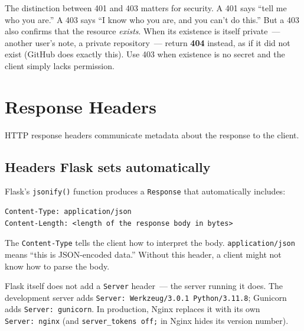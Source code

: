\noindent{}The distinction between 401 and 403 matters for security. A 401 says ``tell me who you are.'' A 403 says ``I know who you are, and you can't do this.'' But a 403 also confirms that the resource \emph{exists}. When its existence is itself private~--- another user's note, a private repository~--- return \textbf{404} instead, as if it did not exist (GitHub does exactly this). Use 403 when existence is no secret and the client simply lacks permission.

\setcounter{section}{2}
\section{Response Headers}\label{34-response-handling:343-response-headers}

HTTP response headers communicate metadata about the response to the client.

\subsection*{Headers Flask sets automatically}\label{34-response-handling:headers-flask-sets-automatically}

Flask's \texttt{jsonify()} function produces a \texttt{Response} that automatically includes:

\begin{outputbox}[short]
\begin{Verbatim}[fontsize=\codesize, breaklines, breakanywhere, breaksymbolleft={\tiny\textcolor{muted}{$\hookrightarrow$}}]
Content-Type: application/json
Content-Length: <length of the response body in bytes>
\end{Verbatim}
\end{outputbox}

\noindent{}The \texttt{Content-Type} tells the client how to interpret the body. \texttt{application/json} means ``this is JSON-encoded data.'' Without this header, a client might not know how to parse the body.

Flask itself does not add a \texttt{Server} header~--- the server running it does. The development server adds \texttt{Server:}\allowbreak{}\texttt{\ Werkzeug/}\allowbreak{}\texttt{3.}\allowbreak{}\texttt{0.}\allowbreak{}\texttt{1\ Python/}\allowbreak{}\texttt{3.}\allowbreak{}\texttt{11.}\allowbreak{}\texttt{8}; Gunicorn adds \texttt{Server:\ gunicorn}. In production, Nginx replaces it with its own \texttt{Server:\ nginx} (and \texttt{server\_tokens\ off;} in Nginx hides its version number).

